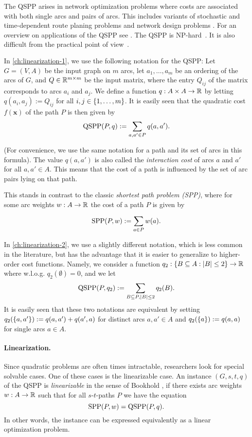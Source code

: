 The QSPP arises 
in network optimization  problems where costs are associated with both single arcs and pairs of arcs.
This includes 
variants of stochastic and time-dependent route planing  problems  
\cite{nie2009reliable,sen2001mean,sivakumar1994variance}
and network design problems 
\cite{murakami1997restoration,gamvros2006satellite}. 
For an overview on applications of the QSPP see \cite{huSo2020,rostami2018}.
The QSPP is NP-hard~\cite{rostami2018}.
It is also difficult from the practical point of view~\cite{huSo2020}.

In \cref{ch:linearization-1}, we use the following notation for the QSPP: Let $G = (V,A)$ be the input graph on $m$ arcs, let $a_1,\dots,a_m$ be an ordering of the arcs of $G$, and $Q \in \mathbb{R}^{m \times m}$ be the input matrix, where the entry $Q_{ij}$ of the matrix corresponds to arcs $a_i$ and $a_j$.
We define a function $q : A \times A \to \mathbb{R}$ by letting $q(a_i,a_j) := Q_{ij}$ for all $i,j \in \{ 1, \ldots, m \}$. It is easily seen that the quadratic cost $f(\pmb x)$ of the path $P$ is then given by
\[ \text{QSPP}(P, q) := \sum_{a,a' \in P} q(a,a').\] 

(For convenience, we use the same notation for a path and its set of arcs in this formula). The value $q(a,a')$ is also called the \emph{interaction cost} of arcs $a$ and $a'$ for all $a,a' \in A$. This means that the cost of a path is influenced by the set of arc pairs lying on that path.

This stands in contrast to the classic \emph{shortest path problem (SPP)}, where for some arc weights $w : A \to \mathbb{R}$ the cost of a path $P$ is given by 

\[ \text{SPP}(P, w) := \sum_{a \in P} w(a).\]

In \cref{ch:linearization-2}, we use a slightly different notation, which is less common in the literature, but has the advantage that it is easier to generalize to higher-order cost functions. Namely, we consider a function $q_2 : \{ B \subseteq A : |B| \leq 2 \} \to \mathbb{R}$ where w.l.o.g. $q_2(\emptyset) = 0$, and we let
\[ \text{QSPP}(P, q_2) := \sum_{B \subseteq P, |B| \leq 2} q_2(B).\]
It is easily seen that these two notations are equivalent by setting $q_2(\{ a,a' \}) := q(a,a') + q(a',a)$ for distinct arcs $a,a' \in A$ and $q_2(\{ a \}) := q(a,a)$ for single arcs $a \in A$.

\paragraph*{Linearization.}
Since quadratic problems are often times intractable, researchers look for special solvable cases. One of these cases is the linearizable case. An instance $(G,s,t,q)$ of the QSPP is \emph{linearizable} in the sense of Bookhold \cite{bookhold1990contribution}, if there exists arc weights $w : A \to \mathbb{R}$ such that for all $s$-$t$-paths $P$ we have the equation 
\[\text{SPP}(P, w) = \text{QSPP}(P, q). \]
In other words, the instance can be expressed equivalently as a linear optimization problem.

